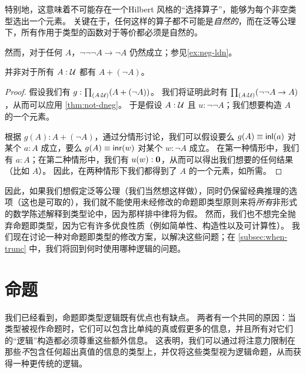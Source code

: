 \begin{rmk}
  特别地，这意味着不可能存在一个Hilbert 风格的``选择算子''，能够为每个非空类型选出一个元素。
  关键在于，任何这样的算子都不可能是\emph{自然的}，而在泛等公理下，所有作用于类型的函数对于等价都必须是自然的。
\end{rmk}

\begin{rmk}
  然而，对于任何 $A$，$\neg\neg\neg A \to \neg A$ 仍然成立；参见\cref{ex:neg-ldn}。
\end{rmk}

\begin{cor}\label{thm:not-lem}
  并非对于所有 $A:\mathcal{U}$ 都有 $A+(\neg A)$。
\end{cor}

\begin{proof}
  假设我们有 $g:\prd{A:\UU} (A+(\neg A))$。
  我们将证明此时有 $\prd{A:\UU} (\neg\neg A \to A)$，从而可以应用 \cref{thm:not-dneg}。
  于是假设 $A:\mathcal{U}$ 且 $u:\neg\neg A$；我们想要构造 $A$ 的一个元素。

  根据 $g(A):A+(\neg A)$，通过分情形讨论，我们可以假设要么 $g(A)\equiv {\mathsf{inl}}(a)$ 对某个 $a:A$ 成立，要么 $g(A)\equiv {\mathsf{inr}}(w)$ 对某个 $w:\neg A$ 成立。
  在第一种情形中，我们有 $a:A$；在第二种情形中，我们有 $u(w):\mathbf{0}$，从而可以得出我们想要的任何结果（比如 $A$）。
  因此，在两种情形下我们都得到了 $A$ 的一个元素，如所需。
\end{proof}

因此，如果我们想假定泛等公理（我们当然想这样做），同时仍保留经典推理的选项（这也是可取的），我们就不能使用未经修改的命题即类型原则来将\emph{所有}非形式的数学陈述解释到类型论中，因为那样排中律将为假。
然而，我们也不想完全抛弃命题即类型，因为它有许多优良性质（例如简单性、构造性以及可计算性）。
我们现在讨论一种对命题即类型的修改方案，以解决这些问题；在 \cref{subsec:when-trunc} 中，我们将回到何时使用哪种逻辑的问题。
%
%
%

\section{命题}
\label{subsec:hprops}

%
%
%
我们已经看到，命题即类型逻辑既有优点也有缺点。
两者有一个共同的原因：当类型被视作命题时，它们可以包含比单纯的真或假更多的信息，并且所有对它们的``逻辑''构造都必须尊重这些额外信息。
这表明，我们可以通过将注意力限制在那些\emph{不}包含任何超出真值的信息的类型上，并仅将这些类型视为逻辑命题，从而获得一种更传统的逻辑。

